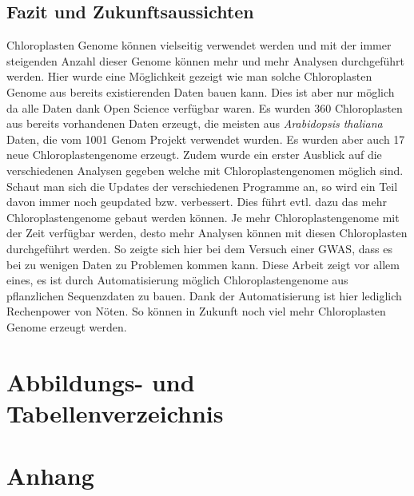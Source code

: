 \documentclass{scrartcl}
\begin{document}
\subsection{Fazit und Zukunftsaussichten}
\label{sec-5-8}
Chloroplasten Genome können vielseitig verwendet werden und mit der immer steigenden Anzahl dieser Genome können mehr und mehr Analysen durchgeführt werden. Hier wurde eine Möglichkeit gezeigt wie man solche Chloroplasten Genome
aus bereits existierenden Daten bauen kann. Dies ist aber nur möglich da alle Daten dank Open Science verfügbar waren. Es wurden 360 Chloroplasten aus bereits vorhandenen Daten erzeugt, die meisten aus \emph{Arabidopsis thaliana}
Daten, die vom 1001 Genom Projekt verwendet wurden. Es wurden aber auch 17 neue Chloroplastengenome erzeugt. Zudem wurde ein erster Ausblick auf die verschiedenen Analysen gegeben welche mit Chloroplastengenomen möglich sind.
Schaut man sich die Updates der verschiedenen Programme an, so wird ein Teil davon immer noch geupdated bzw. verbessert. Dies führt evtl. dazu das mehr Chloroplastengenome gebaut werden können.  Je mehr Chloroplastengenome mit der Zeit verfügbar werden, desto 
mehr Analysen können mit diesen Chloroplasten durchgeführt werden. So zeigte sich hier bei dem Versuch einer GWAS, dass es bei zu wenigen Daten zu Problemen kommen kann. 
Diese Arbeit zeigt vor allem eines, es ist durch Automatisierung möglich Chloroplastengenome aus pflanzlichen Sequenzdaten zu bauen. Dank der Automatisierung ist hier lediglich Rechenpower von Nöten. So können in Zukunft
noch viel mehr Chloroplasten Genome erzeugt werden.
\section{Abbildungs- und Tabellenverzeichnis}
\label{sec-6}
\listoffigures

\listoftables
\clearpage
\section{Anhang}
\label{sec-7}
\end{document}

